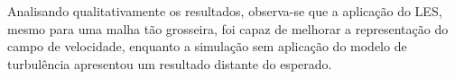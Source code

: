 Analisando qualitativamente os resultados, observa-se que a aplicação do LES, mesmo para uma malha tão grosseira, foi capaz de melhorar a representação do campo de velocidade, enquanto a simulação sem aplicação do modelo de turbulência apresentou um resultado distante do esperado.

